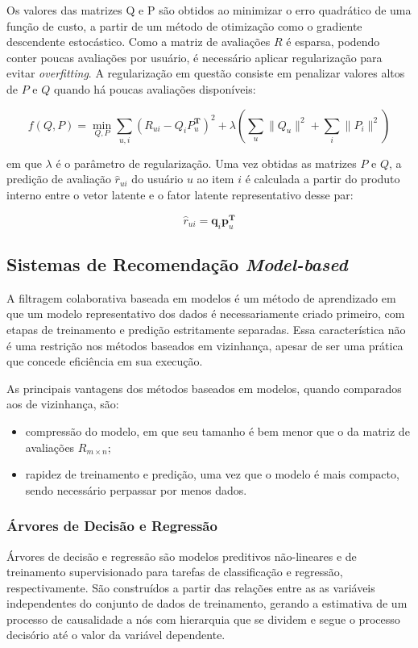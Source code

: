 Os valores das matrizes Q e P são obtidos ao minimizar o erro quadrático de uma
função de custo, a partir de um método de otimização como o gradiente
descendente estocástico. Como a matriz de avaliações $R$ é esparsa,
podendo conter poucas avaliações por usuário, é necessário aplicar regularização
para evitar \textit{overfitting}. A regularização em questão consiste em
penalizar valores altos de $P$ e $Q$ quando há poucas avaliações disponíveis:

\begin{equation}
    f(Q,P) = \min_{Q,P} \sum_{u,i} (R_{ui} - Q_i P_u^{\mathbf{T}})^2 + \lambda (\sum_u \|Q_u\|^2 + \sum_i \|P_i\|^2)
\end{equation}

em que $\lambda$ é o parâmetro de regularização. Uma vez obtidas as matrizes $P$
e $Q$, a predição de avaliação $\hat{r}_{ui}$ do usuário $u$ ao item $i$ é
calculada a partir do produto interno entre o vetor latente e o fator latente representativo
desse par:

\begin{equation} \label{fator_latente}
    \hat{r}_{ui} = \mathbf{q}_i \mathbf{p}_u^{\mathbf{T}}
\end{equation}

\subsection{Sistemas de Recomendação \textit{Model-based}}
A filtragem colaborativa baseada em modelos é um método de aprendizado em que um
modelo representativo dos dados é necessariamente criado primeiro, com etapas de
treinamento e predição estritamente separadas. Essa característica  não é uma
restrição nos métodos baseados em vizinhança, apesar de ser uma prática que
concede eficiência em sua execução.

As principais vantagens dos métodos baseados em modelos, quando comparados aos de vizinhança, são:
\begin{itemize}
    \item compressão do modelo, em que seu tamanho é bem menor que o da matriz de avaliações $R_{m \times n}$;
    \item rapidez de treinamento e predição, uma vez que o modelo é mais compacto, sendo necessário perpassar por menos dados.
\end{itemize}
\subsubsection{Árvores de Decisão e Regressão}
Árvores de decisão e regressão são modelos preditivos não-lineares e de
treinamento supervisionado para tarefas de classificação e regressão,
respectivamente. São construídos a partir das relações entre as as variáveis
independentes do conjunto de dados de treinamento, gerando a estimativa de um
processo de causalidade a nós com hierarquia que se dividem e segue o processo
decisório até o valor da variável dependente.


